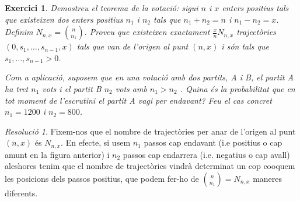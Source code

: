 \documentclass[10pt,a4paper]{article}
\newtheorem{exercici}{Exercici}
\theoremstyle{definition}
\theoremstyle{remark}
\newtheorem*{res}{Resolució}
\begin{document}
\begin{exercici}
  Demostreu el teorema de la votació: sigui $n$ i $x$ enters positius tals que existeixen dos enters positius $n_1$ i $n_2$ tals que $n_1 + n_2 = n$ i $n_1-n_2=x$. Definim $N_{n,x}=\binom{n}{n_1}$. Proveu que existeixen exactament $\frac{x}{n}N_{n,x}$ trajectòries $(0,s_1,\ldots,s_{n-1},x)$ tals que van de l'origen al punt $(n,x)$ i són tals que $s_1,\ldots,s_{n-1}>0$.

  Com a aplicació, suposem que en una votació amb dos partits, A i B, el partit A ha tret $n_1$ vots i el partit B $n_2$ vots amb $n_1 > n_2$ . Quina és la probabilitat que en tot moment de l'escrutini el partit A vagi per endavant? Feu el cas concret $n_1=1200$ i $n_2=800$.
\end{exercici}
\begin{res}
  Fixem-nos que el nombre de trajectòries per anar de l'origen al punt $(n,x)$ és $N_{n,x}$. En efecte, si usem $n_1$ passos cap endavant (i.e positius o cap amunt en la figura anterior) i $n_2$ passos cap endarrera (i.e. negatius o cap avall) aleshores tenim que el nombre de trajectòries vindrà determinat un cop co\lgem oquem les posicions dels passos positius, que podem fer-ho de $\binom{n}{n_1}=N_{n,x}$ maneres diferents.


\end{res}
\end{document}
